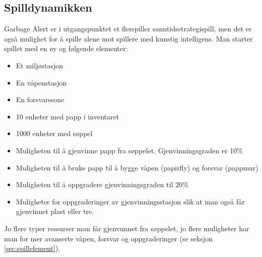 

\subsection{Spilldynamikken}
Garbage Alert er i utgangspunktet et flerspiller sanntidsstrategispill,
men det er også mulighet for å spille alene mot spillere med kunstig
intelligens. Man starter spillet med en øy og følgende elementer:
\begin{itemize}
	\item Et miljøstasjon
	\item En våpenstasjon
	\item En forsvarssone
	\item 10 enheter med papp i inventaret
	\item 1000 enheter med søppel
	\item Muligheten til å gjenvinne papp fra søppelet. Gjenvinningsgraden er 10\%
	\item Muligheten til å bruke papp til å bygge våpen (papirfly) og forsvar (pappmur)
	\item Muligheten til å oppgradere gjenvinningsgraden til 20\%
	\item Muligheter for oppgraderinger av gjenvinningsstasjon slik at man også får gjenvinnet plast eller tre.
\end{itemize}

Jo flere typer ressurser man får gjenvunnet fra søppelet, jo flere muligheter har man for mer avanserte våpen, forsvar og oppgraderinger (se seksjon \ref{sec:spillelement}).


